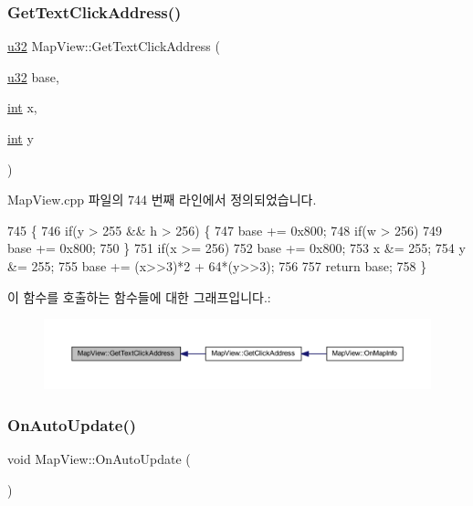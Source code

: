 \subsubsection{\texorpdfstring{Get\+Text\+Click\+Address()}{GetTextClickAddress()}}
{\footnotesize\ttfamily \mbox{\hyperlink{_system_8h_a10e94b422ef0c20dcdec20d31a1f5049}{u32}} Map\+View\+::\+Get\+Text\+Click\+Address (\begin{DoxyParamCaption}\item[{\mbox{\hyperlink{_system_8h_a10e94b422ef0c20dcdec20d31a1f5049}{u32}}}]{base,  }\item[{\mbox{\hyperlink{_util_8cpp_a0ef32aa8672df19503a49fab2d0c8071}{int}}}]{x,  }\item[{\mbox{\hyperlink{_util_8cpp_a0ef32aa8672df19503a49fab2d0c8071}{int}}}]{y }\end{DoxyParamCaption})}



Map\+View.\+cpp 파일의 744 번째 라인에서 정의되었습니다.


\begin{DoxyCode}
745 \{
746   \textcolor{keywordflow}{if}(y > 255 && h > 256) \{
747     base += 0x800;
748     \textcolor{keywordflow}{if}(w > 256)
749       base += 0x800;
750   \}
751   \textcolor{keywordflow}{if}(x >= 256)
752     base += 0x800;
753   x &= 255;
754   y &= 255;
755   base += (x>>3)*2 + 64*(y>>3);
756 
757   \textcolor{keywordflow}{return} base;
758 \}
\end{DoxyCode}
이 함수를 호출하는 함수들에 대한 그래프입니다.\+:
\nopagebreak
\begin{figure}[H]
\begin{center}
\leavevmode
\includegraphics[width=350pt]{class_map_view_a30bef411235a6b8666f34991c2b90619_icgraph}
\end{center}
\end{figure}
\mbox{\label{class_map_view_ace8d1802d7e8ae5bd92e572b9c0c84df}} 
\subsubsection{\texorpdfstring{On\+Auto\+Update()}{OnAutoUpdate()}}
{\footnotesize\ttfamily void Map\+View\+::\+On\+Auto\+Update (\begin{DoxyParamCaption}{ }\end{DoxyParamCaption})\hspace{0.3cm}{\ttfamily [protected]}}



